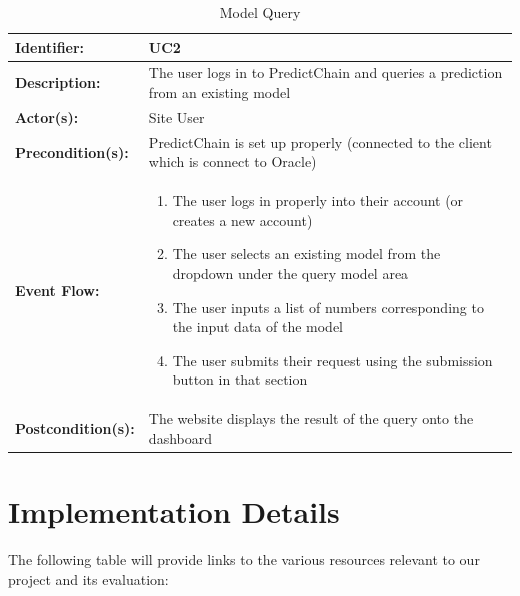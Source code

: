 \documentclass{article}
\begin{document}
    \begin{table}[H]
        \caption{Model Query}
        \label{tab:model-query}
        \centering
        \begin{tabular}{|p{3cm}|p{8cm}|}
            \hline
            \textbf{Identifier:} & UC2 \\
            \hline
            \textbf{Description:} & The user logs in to PredictChain and queries a prediction from an existing model\\
            \hline
            \textbf{Actor(s):} & Site User \\
            \hline
            \textbf{Precondition(s):} & PredictChain is set up properly (connected to the client which is connect to Oracle) \\
            \hline
            \textbf{Event Flow:} &
            \begin{enumerate}
                \item The user logs in properly into their account (or creates a new account)
                \item The user selects an existing model from the dropdown under the query model area
                \item The user inputs a list of numbers corresponding to the input data of the model
                \item The user submits their request using the submission button in that section
            \end{enumerate} \\
            \hline
            \textbf{Postcondition(s):} & The website displays the result of the query onto the dashboard\\
            \hline
        \end{tabular}
    \end{table}

    \section{Implementation Details}


    The following table will provide links to the various resources relevant to our project and its evaluation:
\end{document}
